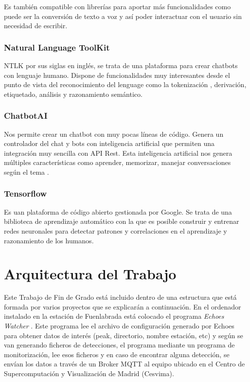Es también compatible con librerías para aportar más funcionalidades como puede ser la conversión de texto a voz y así poder interactuar con el usuario sin necesidad de escribir.

\subsubsection{Natural Language ToolKit} NTLK por sus siglas en inglés, se trata de una plataforma para crear chatbots con lenguaje humano. Dispone de funcionalidades muy interesantes desde el punto de vista del reconocimiento del lenguage como la tokenización , derivación, etiquetado, análisis y razonamiento semántico.

\subsubsection{ChatbotAI} Nos permite crear un chatbot con muy pocas líneas de código. Genera un controlador del chat y bots con inteligencia artificial que permiten una integración muy sencilla con API Rest. Esta inteligencia artificial nos genera múltiples características como aprender, memorizar, manejar conversaciones según el tema \cite{chatbotAI}. 

\subsubsection{Tensorflow} Es uan plataforma de código abierto gestionada por Google. Se trata de una biblioteca de aprendizaje automático con la que es posible construir y entrenar redes neuronales para detectar patrones y correlaciones en el aprendizaje y razonamiento de los humanos. 

\section{Arquitectura del Trabajo}

Este Trabajo de Fin de Grado está incluido dentro de una estructura que está formada por varios proyectos que se explicarán a continuación.
En el ordenador instalado en la estación de Fuenlabrada está colocado el programa \textit{Echoes Watcher} \cite{echoesWatcher}. Este programa lee el archivo de configuración  generado por Echoes para obtener datos de interés (peak, directorio, nombre estación, etc) y según se van generando ficheros de detecciones, el programa mediante un programa de monitorización, lee esos ficheros y en caso de encontrar alguna detección, se envían los datos a través de un Broker MQTT \cite{singh2015secure} al equipo ubicado en el Centro de Supercomputación y Visualización de Madrid (Cesvima).

